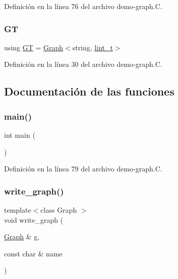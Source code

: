 Definición en la línea 76 del archivo demo-\/graph.\+C.

\mbox{\label{demo-graph_8_c_aa29146ba261a2a26fce51cbd8557db3b}} 
\subsubsection{\texorpdfstring{GT}{GT}}
{\footnotesize\ttfamily using \hyperlink{demo-buildgraph_8_c_a3001c40d2c31ca87ed96cd7d1334a55e}{GT} =  \hyperlink{class_designar_1_1_graph}{Graph}$<$string, \hyperlink{namespace_designar_a9d113d66a39e82b73727c72cd3a52f73}{lint\+\_\+t}$>$}



Definición en la línea 30 del archivo demo-\/graph.\+C.



\subsection{Documentación de las funciones}
\mbox{\label{demo-graph_8_c_ae66f6b31b5ad750f1fe042a706a4e3d4}} 
\subsubsection{\texorpdfstring{main()}{main()}}
{\footnotesize\ttfamily int main (\begin{DoxyParamCaption}{ }\end{DoxyParamCaption})}



Definición en la línea 79 del archivo demo-\/graph.\+C.

\mbox{\label{demo-graph_8_c_a75dee8f1e6289c0fbd2060e643605bfe}} 
\subsubsection{\texorpdfstring{write\+\_\+graph()}{write\_graph()}}
{\footnotesize\ttfamily template$<$class Graph $>$ \\
void write\+\_\+graph (\begin{DoxyParamCaption}\item[{\hyperlink{class_designar_1_1_graph}{Graph} \&}]{g,  }\item[{const char \&}]{name }\end{DoxyParamCaption})}



